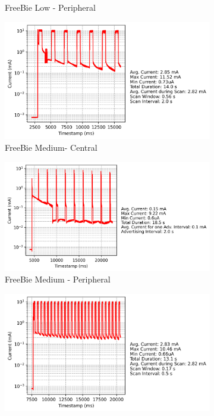 \begin{figure}[t]
\begin{subfigure}{0.45\linewidth}
        \caption{FreeBie Low - Peripheral}
        \label{fig:freebie_low_peripheral}
    \end{subfigure}
    \begin{subfigure}{0.45\linewidth}
        \centering
        \includegraphics[width=\linewidth]{chapters/Results/Current vs Timestamp - FreeBie Central Medium.png}
        \caption{FreeBie Medium- Central}
        \label{fig:freebie_medium_central}
    \end{subfigure}\hfill
    \begin{subfigure}{0.45\linewidth}
        \centering
        \includegraphics[width=\linewidth]{chapters/Results/Current vs Timestamp - FreeBie Peripheral Medium.png}
        \caption{FreeBie Medium - Peripheral}
        \label{fig:freebie_medium_peripheral}
    \end{subfigure}
    \begin{subfigure}{0.45\linewidth}
        \centering
        \includegraphics[width=\linewidth]{chapters/Results/Current vs Timestamp - FreeBie Central High.png}

\end{subfigure}
\end{figure}
